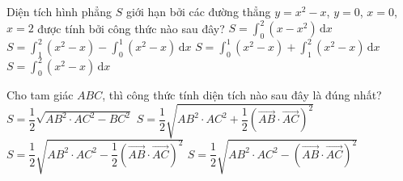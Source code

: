 \begin{ex}%
	Diện tích hình phẳng $S$ giới hạn bởi các đường thẳng $ y=x^2-x$, $y=0$, $x=0$, $x=2$ được  tính bởi công thức nào sau đây?
	\choice 
		{$ S=\displaystyle\int_0^2\left(x-x^2\right)\mathrm{\,d}x$} 
		{\True  $S=\displaystyle\int_1^2\left(x^2-x\right)-\displaystyle\int_0^1\left(x^2-x\right)\mathrm{\,d}x$}
		{$ S=\displaystyle\int_0^1\left(x^2-x\right)+\displaystyle\int_1^2\left(x^2-x\right)\mathrm{\,d}x$} 
		{$  S=\displaystyle\int_0^2\left(x^2-x\right)\mathrm{\,d}x$}
\end{ex}

\begin{ex}%
	Cho tam  giác $ABC$, thì công thức tính diện tích nào sau đây là đúng nhất?
	\choice 
		 {$S = \dfrac{1}{2}\sqrt{AB^2\cdot AC^2 - BC^2}$}
		{$S =  \dfrac{1}{2}\sqrt{AB^2\cdot AC^2 + \dfrac{1}{2}\left(\overrightarrow{AB}\cdot \overrightarrow{AC}\right)^2}$}
		{$S = \dfrac{1}{2}\sqrt{AB^2\cdot AC^2 -  \dfrac{1}{2}\left(\overrightarrow{AB}\cdot \overrightarrow{AC}\right)^2}$}
		{\True $S = \dfrac{1}{2}\sqrt{AB^2\cdot AC^2 -  \left(\overrightarrow{AB}\cdot \overrightarrow{AC}\right)^2}$}
\end{ex}

